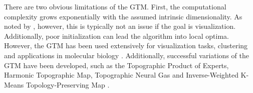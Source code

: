 There are two obvious limitations of the GTM.  First, the computational complexity grows exponentially with the assumed intrinsic dimensionality.  As noted by \cite{Pena2007NeuralGasReview}, however, this is typically not an issue if the goal is visualization.  Additionally, poor initialization can lead the algorithm into local optima. However, the GTM has been used extensively for visualization tasks, clustering and applications in molecular biology \citep{Bishop1998GTM, Pena2007NeuralGasReview, Sorzano2014DRReview, Kegl2008PrincipalManifoldsTextbook}.  Additionally, successful variations of the GTM have been developed, such as the Topographic Product of Experts, Harmonic Topographic Map, Topographic Neural Gas and Inverse-Weighted K-Means Topology-Preserving Map \citep{Pena2007NeuralGasReview}.


